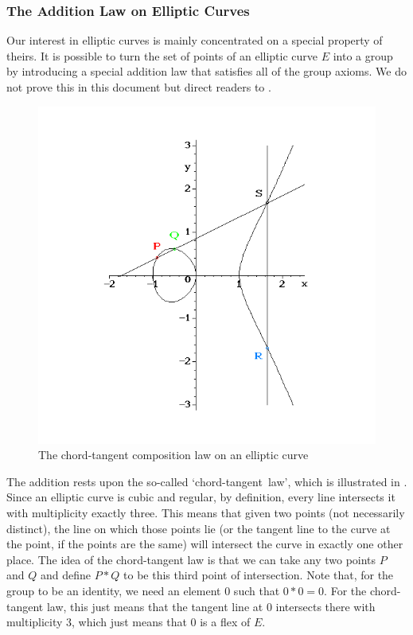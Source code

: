 \subsubsection{The Addition Law on Elliptic Curves}
Our interest in elliptic curves is mainly concentrated on a special property of theirs.
It is possible to turn the set of points of an elliptic curve $E$ into a group by introducing a special addition law that satisfies all of the group axioms.
We do not prove this in this document but direct readers to \cite{silverman2009}.
\begin{figure}[htbp]
	\centering
	\includegraphics[scale=0.5]{addition.png}
	\caption{The chord-tangent composition law on an elliptic curve}
	\label{chord-tangent}
\end{figure}
The addition rests upon the so-called `chord-tangent~law', which is illustrated in .
Since an elliptic curve is cubic and regular, by definition, every line intersects it with multiplicity exactly three.
This means that given two points (not necessarily distinct), the line on which those points lie (or the tangent line to the curve at the point, if the points are the same) will intersect the curve in exactly one other place.
The idea of the chord-tangent law is that we can take any two points $P$ and $Q$ and define $P * Q$ to be this third point of intersection.
Note that, for the group to be an identity, we need an element $0$ such that $0 * 0 = 0$.
For the chord-tangent law, this just means that the tangent line at $0$ intersects there with multiplicity 3, which just means that $0$ is a flex of $E$.

